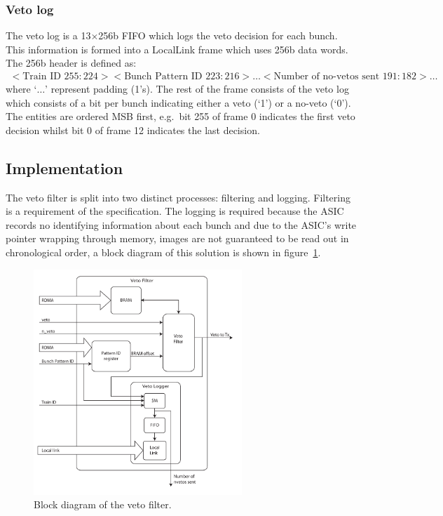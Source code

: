 \subsubsection{Veto log} %
\label{sub:veto_locallink}
The veto log is a 13\( \times \)256b FIFO which logs the veto decision for each bunch. This information is formed into a LocalLink frame which uses 256b data words. The 256b header is defined as:
\begin{align}\label{fmt:ll_header}
  <\text{Train ID } 255:224><\text{Bunch Pattern ID } 223:216>\ldots<\text{Number of no-vetos sent } 191:182> \ldots
\end{align}
where `\( \dots \)' represent padding (1's). The rest of the frame consists of the veto log which consists of a bit per bunch indicating either a veto (`1') or a no-veto (`0'). The entities are ordered MSB first, e.g.\ bit 255 of frame 0 indicates the first veto decision whilst bit 0 of frame 12 indicates the last decision. 
\subsection{Implementation} %
\label{sub:veto_implementation}
The veto filter is split into two distinct processes: filtering and logging. Filtering is a requirement of the specification. The logging is required because the ASIC records no identifying information about each bunch and due to the ASIC's write pointer wrapping through memory, images are not guaranteed to be read out in chronological order, a block diagram of this solution is shown in figure~\ref{fig:veto_filter_entity}.
    
\begin{figure}[htbp]
  \centering
  \includegraphics[width=0.7\textwidth]{images/pdfs/veto_filter_block.pdf}
  \caption{Block diagram of the veto filter.}
  \label{fig:veto_filter_entity}
\end{figure}
    
